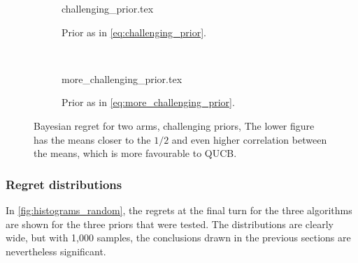 \begin{figure}
    \centering
    \begin{subfigure}{\textwidth}
        \centering
        \newcommand{\myoptions}{
            width=10cm,
            height=8cm,
            xlabel={Kiloturn},
            ylabel={Regret},
            legend entries={UCB, QUCB, Thompson},
            legend pos=north west,
            legend cell align=left,
            mystyle,
            ymax = 400,
        }
        {challenging_prior.tex}
        \caption{
            Prior as in \cref{eq:challenging_prior}.
        }
        \label{fig:random2}
    \end{subfigure}
    \\[3ex]
    \begin{subfigure}{\textwidth}
        \centering
        \newcommand{\myoptions}{
            width=10cm,
            height=8cm,
            xlabel={Kiloturn},
            ylabel={Regret},
            legend entries={UCB, QUCB, Thompson},
            legend pos=north west,
            legend cell align=left,
            mystyle,
        }
        {more_challenging_prior.tex}
        \caption{
            Prior as in \cref{eq:more_challenging_prior}.
        }
        \label{fig:random3}
    \end{subfigure}
    \caption[
        Bayesian regret for two arms, challenging priors.
    ]
    {
        Bayesian regret for two arms, challenging priors,
        The lower figure has the means closer to the $1/2$ and even higher correlation between the means, which is more favourable to QUCB.
    }
    \label{fig:random_challenging}
\end{figure}

\subsubsection{Regret distributions}
In \cref{fig:histograms_random}, the regrets at the final turn for the three algorithms are shown for the three priors that were tested.
The distributions are clearly wide, but with 1,000 samples, the conclusions drawn in the previous sections are nevertheless significant.

